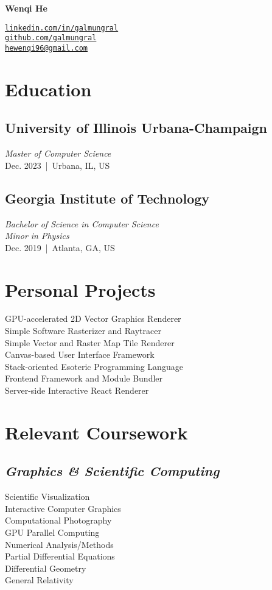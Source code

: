 \documentclass[11pt]{article}
\begin{document}
 
\centering

\begin{minipage}{250pt}
{\Huge\bf Wenqi He}

\vspace{10pt}
\texttt{\href{https://linkedin.com/in/galmungral}{linkedin.com/in/galmungral}\\
\href{https://github.com/galmungral}{github.com/galmungral}\\
\href{mailto:hewenqi96@gmail.com}{hewenqi96@gmail.com}
}

\section*{\sc Education}

\subsection*{University of Illinois Urbana-Champaign}
\textit{Master of Computer Science}\\
Dec. 2023 \,|\, Urbana, IL, US

\subsection*{Georgia Institute of Technology}
\textit{Bachelor of Science in Computer Science}\\
\textit{Minor in Physics}\\
Dec. 2019 \,|\, Atlanta, GA, US

\section*{\sc Personal Projects}

GPU-accelerated 2D Vector Graphics Renderer\\
Simple Software Rasterizer and Raytracer\\
Simple Vector and Raster Map Tile Renderer\\
Canvas-based User Interface Framework\\
Stack-oriented Esoteric Programming Language\\
Frontend Framework and Module Bundler\\
Server-side Interactive React Renderer

\section*{\sc Relevant Coursework}
\subsection*{\it Graphics \& Scientific Computing}
Scientific Visualization\\
Interactive Computer Graphics\\
Computational Photography\\
GPU Parallel Computing\\
Numerical Analysis/Methods\\
Partial Differential Equations\\
Differential Geometry\\
General Relativity


\end{minipage}
\end{document}
